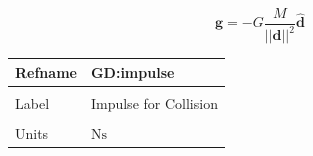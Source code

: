 \documentclass[12pt]{article}
\begin{document}
\begin{displaymath}
\mathbf{g}=-G \frac{M}{{\text{||}\mathbf{d}\text{||}^{2}}} \mathbf{\hat{d}}
\end{displaymath}
\vspace{\baselineskip}
\noindent
\begin{minipage}{\textwidth}
\begin{tabular}{>{\raggedright}p{}>{\raggedright\arraybackslash}p{}}
\toprule \textbf{Refname} & \textbf{GD:impulse}
\label{GD:impulse}
\\ \midrule \\
Label & Impulse for Collision
        
\\ \midrule \\
Units & $\text{N}\text{s}$
        

\end{tabular}
\end{minipage}
\end{document}
